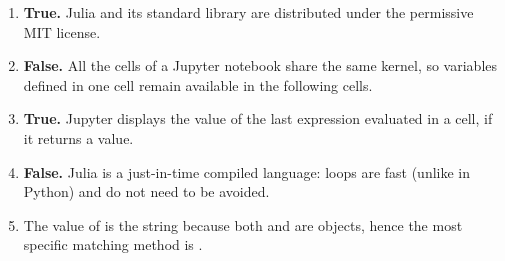 \documentclass{article}
\begin{document}
\begin{enumerate}[itemsep=8pt]
    \item \textbf{True.}
        Julia and its standard library are distributed under the
        permissive MIT license.

    \item \textbf{False.}
        All the cells of a Jupyter notebook share the same kernel,
        so variables defined in one cell remain available in the
        following cells.

    \item \textbf{True.}
        Jupyter displays the value of the last expression evaluated in a
        cell, if it returns a value.

    \item \textbf{False.}
        Julia is a just-in-time compiled language: loops are fast
        (unlike in Python) and do not need to be avoided.

    \item
        The value of  is the string
        because both  and  are 
        objects, hence the most specific matching method is
        .
\end{enumerate}
\fi
\end{document}
